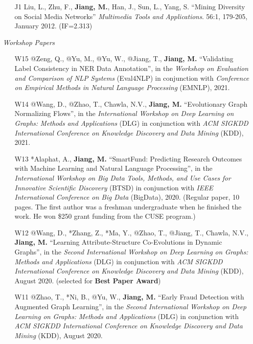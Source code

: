 \documentclass[10pt]{article}
\newenvironment{myindentpar}[1]%
{\begin{list}{}%
         {\setlength{\leftmargin}{#1}}%
         \item[]%
}
{\end{list}}
\newcounter{list}
\begin{document}
\begin{myindentpar}{0.00cm}
\begin{enumerate}[leftmargin=.5cm]
\item[J1] Liu, L., Zhu, F., \textbf{Jiang, M.}, Han, J., Sun, L., Yang, S. ``Mining Diversity on Social Media Networks'' \textit{Multimedia Tools and Applications}. 56:1, 179-205, January 2012. (IF=2.313)

\end{enumerate}

\hspace{-0.25cm}\textit{Workshop Papers}

\begin{enumerate}[leftmargin=.5cm]

\item[W15] @Zeng, Q., @Yu, M., @Yu, W., @Jiang, T., \textbf{Jiang, M.} ``Validating Label Consistency in NER Data Annotation'', in the \textit{Workshop on Evaluation and Comparison of NLP Systems} (Eval4NLP) in conjunction with \textit{Conference on Empirical Methods in Natural Language Processing} (EMNLP), 2021.

\item[W14] @Wang, D., @Zhao, T., Chawla, N.V., \textbf{Jiang, M.} ``Evolutionary Graph Normalizing Flows'', in the \textit{International Workshop on Deep Learning on Graphs: Methods and Applications} (DLG) in conjunction with \textit{ACM SIGKDD International Conference on Knowledge Discovery and Data Mining} (KDD), 2021.

\item[W13] *Alaphat, A., \textbf{Jiang, M.} ``SmartFund: Predicting Research Outcomes with Machine Learning and Natural Language Processing'', in the \textit{International Workshop on Big Data Tools, Methods, and Use Cases for Innovative Scientific Discovery} (BTSD) in conjunction with \textit{IEEE International Conference on Big Data} (BigData), 2020. (Regular paper, 10 pages. The first author was a freshman undergraduate when he finished the work. He won \$250 grant funding from the CUSE program.)

\item[W12] @Wang, D., *Zhang, Z., *Ma, Y., @Zhao, T., @Jiang, T., Chawla, N.V., \textbf{Jiang, M.} ``Learning Attribute-Structure Co-Evolutions in Dynamic Graphs'', in the \textit{Second International Workshop on Deep Learning on Graphs: Methods and Applications} (DLG) in conjunction with \textit{ACM SIGKDD International Conference on Knowledge Discovery and Data Mining} (KDD), August 2020. (selected for \textbf{Best Paper Award})

\item[W11] @Zhao, T., *Ni, B., @Yu, W., \textbf{Jiang, M.} ``Early Fraud Detection with Augmented Graph Learning'', in the \textit{Second International Workshop on Deep Learning on Graphs: Methods and Applications} (DLG) in conjunction with \textit{ACM SIGKDD International Conference on Knowledge Discovery and Data Mining} (KDD), August 2020.


\end{enumerate}
\end{myindentpar}
\end{document}
